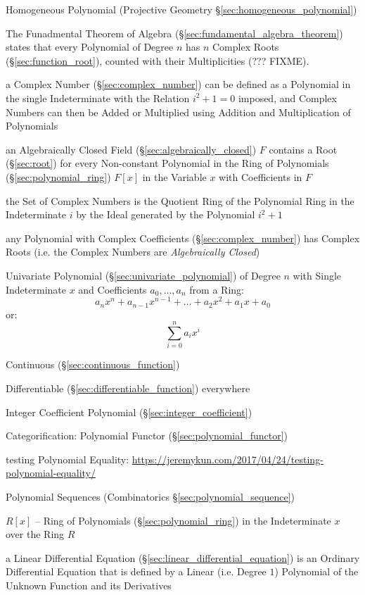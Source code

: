 \fist Homogeneous Polynomial (Projective Geometry
\S\ref{sec:homogeneous_polynomial})

The Funadmental Theorem of Algebra (\S\ref{sec:fundamental_algebra_theorem})
states that every Polynomial of Degree $n$ has $n$ Complex Roots
(\S\ref{sec:function_root}), counted with their Multiplicities (??? FIXME).

a Complex Number (\S\ref{sec:complex_number}) can be defined as a Polynomial in
the single Indeterminate with the Relation $i^2 + 1 = 0$ imposed, and Complex
Numbers can then be Added or Multiplied using Addition and Multiplication of
Polynomials

an Algebraically Closed Field (\S\ref{sec:algebraically_closed}) $F$ contains a
Root (\S\ref{sec:root}) for every Non-constant Polynomial in the Ring of
Polynomials (\S\ref{sec:polynomial_ring}) $F[x]$ in the Variable $x$ with
Coefficients in $F$

the Set of Complex Numbers is the Quotient Ring of the Polynomial Ring in the
Indeterminate $i$ by the Ideal generated by the Polynomial $i^2 + 1$

any Polynomial with Complex Coefficients (\S\ref{sec:complex_number}) has
Complex Roots (i.e. the Complex Numbers are \emph{Algebraically Closed})

Univariate Polynomial (\S\ref{sec:univariate_polynomial}) of Degree
$n$ with Single Indeterminate $x$ and Coefficients $a_0, \ldots, a_n$
from a Ring:
\[
  a_n x^n + a_{n-1} x^{n-1} + \ldots + a_2 x^2 + a_1 x + a_0
\]
or:
\[
  \sum_{i=0}^n a_i x^i
\]

Continuous (\S\ref{sec:continuous_function})

Differentiable (\S\ref{sec:differentiable_function}) everywhere

Integer Coefficient Polynomial (\S\ref{sec:integer_coefficient})

Categorification: Polynomial Functor (\S\ref{sec:polynomial_functor})

testing Polynomial Equality:
\url{https://jeremykun.com/2017/04/24/testing-polynomial-equality/}

\fist Polynomial Sequences (Combinatorics \S\ref{sec:polynomial_sequence})

$R[x]$ -- Ring of Polynomials (\S\ref{sec:polynomial_ring}) in the
Indeterminate $x$ over the Ring $R$

a Linear Differential Equation (\S\ref{sec:linear_differential_equation}) is an
Ordinary Differential Equation that is defined by a Linear (i.e. Degree $1$)
Polynomial of the Unknown Function and its Derivatives




